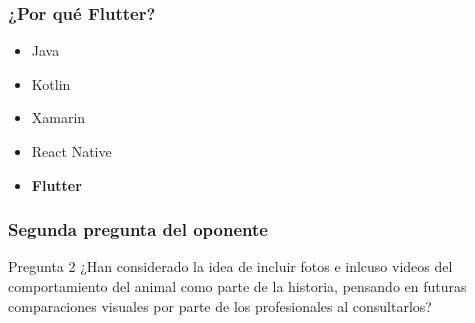 \documentclass[14pt]{beamer}
\begin{document}
\begin{frame}
\frametitle{¿Por qué Flutter?}
\begin{itemize}
\item Java
\item Kotlin
\item Xamarin
\item React Native
\item \textbf{Flutter}

\end{itemize}

\end{frame}



\begin{frame}
\frametitle{Segunda pregunta del oponente}
\begin{block}{Pregunta 2}
¿Han considerado la idea de incluir fotos e inlcuso videos del comportamiento del animal como parte de la historia, pensando en futuras comparaciones visuales por parte de los profesionales al consultarlos?
\end{block}
\end{frame}
\end{document}
